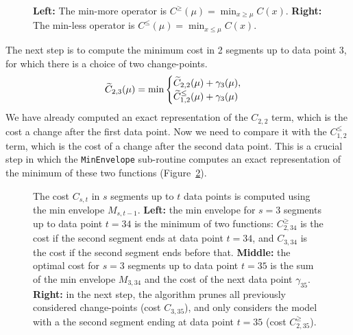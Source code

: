 \documentclass{article}
\begin{document}
\begin{figure}[!t]
  \parbox{3in}{
    \begin{center}
    
    \end{center}
  }
  \parbox{3in}{
    \begin{center}
      
    \end{center}
  }
  \caption{\label{fig:min-operators} \textbf{Left:} The min-more
    operator is $C^{\geq}(\mu)=\min_{x\geq \mu}C(x)$. \textbf{Right:}
    The min-less operator is $C^{\leq}(\mu)=\min_{x\leq
      \mu}C(x)$.}
\end{figure}

The next step is to compute the minimum cost in 2 segments up to data
point 3, for which there is a choice of two change-points.
\begin{equation*}
  \widetilde{C}_{2,3}(\mu) = \min
  \begin{cases}
    \widetilde{C}_{2,2}(\mu)+\gamma_3(\mu), \\
    \widetilde{C}_{1,2}^{\leq}(\mu)+\gamma_3(\mu)
  \end{cases}
\end{equation*}
We have already computed an exact representation of the $C_{2,2}$
term, which is the cost a change after the first data point. Now we
need to compare it with the $C_{1,2}^{\leq}$ term, which is the cost
of a change after the second data point. This is a crucial step in
which the \texttt{MinEnvelope} sub-routine computes an exact
representation of the minimum of these two functions
(Figure~\ref{fig:min-envelope}).

\begin{figure}[!t]
  \begin{center}
    
  \end{center}
  \caption{\label{fig:min-envelope} The cost $C_{s,t}$ in $s$ segments
    up to $t$ data points is computed using the min envelope
    $M_{s,t-1}$. \textbf{Left:} the min envelope for $s=3$ segments up
    to data point $t=34$ is the minimum of two functions:
    $C^{\geq}_{2,34}$ is the cost if the second segment ends at data
    point $t=34$, and $C_{3,34}$ is the cost if the second segment
    ends before that. \textbf{Middle:} the optimal cost for $s=3$
    segments up to data point $t=35$ is the sum of the min envelope
    $M_{3,34}$ and the cost of the next data point
    $\gamma_{35}$. \textbf{Right:} in the next step, the
    algorithm prunes all previously considered change-points (cost
    $C_{3,35}$), and only considers the model with a the second segment
    ending at data point $t=35$ (cost $C^{\geq}_{2,35}$).}
\end{figure}
\end{document}
